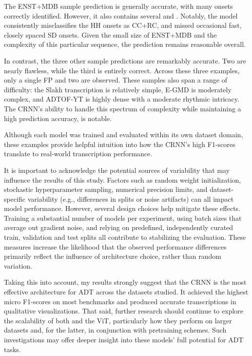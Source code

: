 The ENST+MDB sample prediction is generally accurate, with many onsets correctly identified. However, it also contains several  and . Notably, the model consistently misclassifies the \acrfull{HH} onsets as \acrfull{CC+RC}, and missed occasional fast, closely spaced \acrfull{SD} onsets. Given the small size of ENST+MDB and the complexity of this particular sequence, the prediction remains reasonable overall.

In contrast, the three other sample predictions are remarkably accurate. Two are nearly flawless, while the third is entirely correct. Across these three examples, only a single \acrshort{FP} and two  are observed. These samples also span a range of difficulty: the Slakh transcription is relatively simple, E-GMD is moderately complex, and ADTOF-YT is highly dense with a moderate rhythmic intricacy. The \gls{CRNN}'s ability to handle this spectrum of complexity while maintaining a high prediction accuracy, is notable.

Although each model was trained and evaluated within its own dataset domain, these examples provide helpful intuition into how the \gls{CRNN}'s high F1-scores translate to real-world transcription performance.

It is important to acknowledge the potential sources of variability that may influence the results of this study. Factors such as random weight initialization, stochastic hyperparameter sampling, numerical precision limits, and dataset-specific variability (e.g., differences in splits or noise artifacts) can all impact model performance. However, several design choices help mitigate these effects. Training a substantial number of models per experiment, using batch sizes that average out gradient noise, and relying on predefined, independently curated train, validation and test splits all contribute to stabilizing the evaluation. These measures increase the likelihood that the observed performance differences primarily reflect the influence of architecture choice, rather than random variation.

Taking this into account, my results strongly suggest that the \acrfull{CRNN} is the most effective architecture for \gls{ADT} across the datasets studied. It achieved the highest micro F1-scores on most benchmarks and produced accurate transcriptions in qualitative visualizations. That said, further research should continue to explore the scalability of both  and the \acrfull{ViT}, particularly how they perform on larger datasets and, for the latter, in conjunction with pretraining schemes. Such investigations may offer deeper insight into these models' full potential for \gls{ADT} tasks.